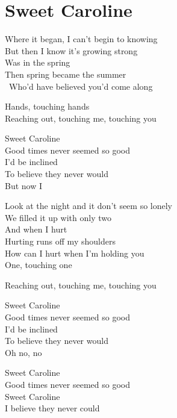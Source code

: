 \section{Sweet Caroline}
Where it began, I can't begin to knowing\\
But then I know it's growing strong\\
Was in the spring\\
Then spring became the summer\\\
Who'd have believed you'd come along

Hands, touching hands\\
Reaching out, touching me, touching you

Sweet Caroline\\
Good times never seemed so good\\
I'd be inclined\\
To believe they never would\\
But now I

Look at the night and it don't seem so lonely\\
We filled it up with only two\\
And when I hurt\\
Hurting runs off my shoulders\\
How can I hurt when I'm holding you\\
One, touching one

Reaching out, touching me, touching you

Sweet Caroline\\
Good times never seemed so good\\
I'd be inclined\\
To believe they never would\\
Oh no, no

Sweet Caroline\\
Good times never seemed so good\\
Sweet Caroline\\
I believe they never could

